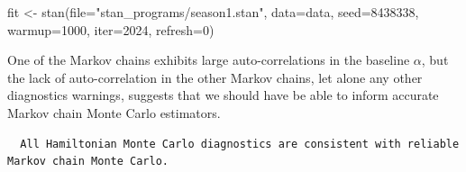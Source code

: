\documentclass[
  letterpaper,
  DIV=11,
  numbers=noendperiod]{scrartcl}
\newenvironment{Shaded}{\begin{snugshade}}{\end{snugshade}}
\newcommand{\AttributeTok}[1]{\textcolor[rgb]{0.40,0.45,0.13}{#1}}
\newcommand{\ConstantTok}[1]{\textcolor[rgb]{0.56,0.35,0.01}{#1}}
\newcommand{\DecValTok}[1]{\textcolor[rgb]{0.68,0.00,0.00}{#1}}
\newcommand{\FunctionTok}[1]{\textcolor[rgb]{0.28,0.35,0.67}{#1}}
\newcommand{\NormalTok}[1]{\textcolor[rgb]{0.00,0.23,0.31}{#1}}
\newcommand{\OtherTok}[1]{\textcolor[rgb]{0.00,0.23,0.31}{#1}}
\newcommand{\SpecialCharTok}[1]{\textcolor[rgb]{0.37,0.37,0.37}{#1}}
\newcommand{\StringTok}[1]{\textcolor[rgb]{0.13,0.47,0.30}{#1}}
\begin{document}
\begin{Shaded}
\begin{Highlighting}[]
\NormalTok{fit }\OtherTok{\textless{}{-}} \FunctionTok{stan}\NormalTok{(}\AttributeTok{file=}\StringTok{"stan\_programs/season1.stan"}\NormalTok{,}
            \AttributeTok{data=}\NormalTok{data, }\AttributeTok{seed=}\DecValTok{8438338}\NormalTok{,}
            \AttributeTok{warmup=}\DecValTok{1000}\NormalTok{, }\AttributeTok{iter=}\DecValTok{2024}\NormalTok{, }\AttributeTok{refresh=}\DecValTok{0}\NormalTok{)}
\end{Highlighting}
\end{Shaded}

One of the Markov chains exhibits large auto-correlations in the
baseline \(\alpha\), but the lack of auto-correlation in the other
Markov chains, let alone any other diagnostics warnings, suggests that
we should have be able to inform accurate Markov chain Monte Carlo
estimators.

\begin{Shaded}
\end{Shaded}

\begin{verbatim}
  All Hamiltonian Monte Carlo diagnostics are consistent with reliable
Markov chain Monte Carlo.
\end{verbatim}

\begin{Shaded}
\end{Shaded}
\end{document}
